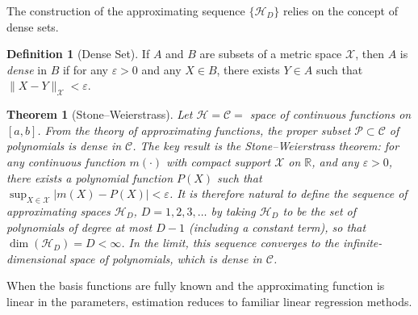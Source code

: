\documentclass[11pt]{article}
\theoremstyle{definition}
\newtheorem{definition}{Definition}[section]
\theoremstyle{plain}
\newtheorem{theorem}{Theorem}[section]
\theoremstyle{remark}
\begin{document}
The construction of the approximating sequence $\{\mathcal{H}_D\}$ relies on the concept of dense sets.

\begin{definition}[Dense Set]
    If $A$ and $B$ are subsets of a metric space $\mathcal{X}$, then $A$ is \textit{dense} in $B$ if for any $\varepsilon > 0$ and any $X \in B$, there exists $Y \in A$ such that $\|X - Y\|_{\mathcal{X}} < \varepsilon$.
\end{definition}

\begin{theorem}[Stone--Weierstrass]
    Let $\mathcal{H} = \mathcal{C} = $ space of continuous functions on $[a,b]$. From the theory of approximating functions, the proper subset $\mathcal{P} \subset \mathcal{C}$ of polynomials is dense in $\mathcal{C}$. The key result is the \textit{Stone--Weierstrass theorem}: for any continuous function $m(\cdot)$ with compact support $\mathcal{X}$ on $\mathbb{R}$, and any $\varepsilon > 0$, there exists a polynomial function $P(X)$ such that $\sup_{X \in \mathcal{X}} |m(X) - P(X)| < \varepsilon$. It is therefore natural to define the sequence of approximating spaces $\mathcal{H}_D$, $D = 1, 2, 3, \ldots$ by taking $\mathcal{H}_D$ to be the set of polynomials of degree at most $D - 1$ (including a constant term), so that $\dim(\mathcal{H}_D) = D < \infty$. In the limit, this sequence converges to the infinite-dimensional space of polynomials, which is dense in $\mathcal{C}$.
\end{theorem}


When the basis functions are fully known and the approximating function is linear in the parameters, estimation reduces to familiar linear regression methods.
\end{document}
